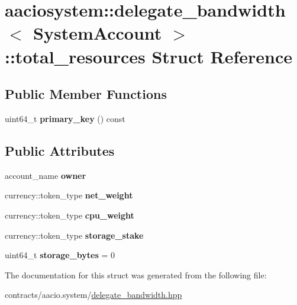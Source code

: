 \hypertarget{structaaciosystem_1_1delegate__bandwidth_1_1total__resources}{}\section{aaciosystem\+:\+:delegate\+\_\+bandwidth$<$ System\+Account $>$\+:\+:total\+\_\+resources Struct Reference}
\label{structaaciosystem_1_1delegate__bandwidth_1_1total__resources}
\subsection*{Public Member Functions}
\begin{DoxyCompactItemize}
\item 
\mbox{\label{structaaciosystem_1_1delegate__bandwidth_1_1total__resources_aaa08c2c9e56a72df27103b5d774f511c}} 
uint64\+\_\+t {\bfseries primary\+\_\+key} () const
\end{DoxyCompactItemize}
\subsection*{Public Attributes}
\begin{DoxyCompactItemize}
\item 
\mbox{\label{structaaciosystem_1_1delegate__bandwidth_1_1total__resources_a89c4a2f951316f10248c7e1ac7ccbf7d}} 
account\+\_\+name {\bfseries owner}
\item 
\mbox{\label{structaaciosystem_1_1delegate__bandwidth_1_1total__resources_a7e9415cff01fd8e79676002e72a9ea0c}} 
currency\+::token\+\_\+type {\bfseries net\+\_\+weight}
\item 
\mbox{\label{structaaciosystem_1_1delegate__bandwidth_1_1total__resources_a25d502f3353c3ba65c4480f596dfa838}} 
currency\+::token\+\_\+type {\bfseries cpu\+\_\+weight}
\item 
\mbox{\label{structaaciosystem_1_1delegate__bandwidth_1_1total__resources_abdfdec25ebfe6834769d10d0aa05810e}} 
currency\+::token\+\_\+type {\bfseries storage\+\_\+stake}
\item 
\mbox{\label{structaaciosystem_1_1delegate__bandwidth_1_1total__resources_a292ce5b91930722a64f1ee7dc28c689c}} 
uint64\+\_\+t {\bfseries storage\+\_\+bytes} = 0
\end{DoxyCompactItemize}


The documentation for this struct was generated from the following file\+:\begin{DoxyCompactItemize}
\item 
contracts/aacio.\+system/\mbox{\hyperlink{delegate__bandwidth_8hpp}{delegate\+\_\+bandwidth.\+hpp}}\end{DoxyCompactItemize}
